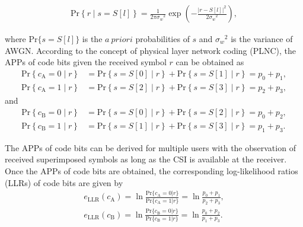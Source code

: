 \begin{align}
 \text{Pr}\left\{r\middle|s = S[l]\right\} = \frac{1}{2\pi{\sigma_w}^{2}}\exp\left(-\frac{\lvert r-S[l]\rvert^{2}}{2{\sigma_w}^{2}}\right) ,
\label{equ:app_2}
\end{align}

where $\text{Pr}\{s = S[l]\}$ is the $a \ priori$ probabilities of $s$ and ${\sigma_w}^2$ is the variance of AWGN. According to the concept of physical layer network coding (PLNC), the APPs of code bits given the received symbol $r$ can be obtained as
\begin{align}
 \text{Pr}\left\{c_\text{A} = 0 \middle| r\right\} &= \text{Pr}\left\{s = S[0]\middle|r\right\} + \text{Pr}\left\{s = S[1]\middle|r\right\} = p_{0} + p_{1}, \nonumber \\
 \text{Pr}\left\{c_\text{A} = 1 \middle| r\right\} &= \text{Pr}\left\{s = S[2]\middle|r\right\} + \text{Pr}\left\{s = S[3]\middle|r\right\} = p_{2} + p_{3},
\end{align}
and
\begin{align}
 \text{Pr}\left\{c_\text{B} = 0 \middle| r\right\} &= \text{Pr}\left\{s = S[0]\middle|r\right\} + \text{Pr}\left\{s = S[2]\middle|r\right\} = p_{0} + p_{2}, \nonumber \\
 \text{Pr}\left\{c_\text{B} = 1 \middle| r\right\} &= \text{Pr}\left\{s = S[1]\middle|r\right\} + \text{Pr}\left\{s = S[3]\middle|r\right\} = p_{1} + p_{3}.
\end{align}

The APPs of code bits can be derived for multiple users with the observation of received superimposed symbols as long as the CSI is available at the receiver. Once the APPs of code bits are obtained, the corresponding log-likelihood ratios (LLRs) of code bits are given by
\begin{align}
 e_{\text{LLR}}(c_\text{A}) = \ln \frac {\text{Pr}\{c_\text{A} = 0|r\}} {\text{Pr}\{c_\text{A} = 1|r\}} = \ln\frac {p_{0}+p_{1}} {p_{2}+p_{3}}, \nonumber \\
 e_{\text{LLR}}(c_\text{B}) = \ln \frac {\text{Pr}\{c_\text{B} = 0|r\}} {\text{Pr}\{c_\text{B} = 1|r\}} = \ln\frac {p_{0}+p_{2}} {p_{1}+p_{3}}.
\label{equ:bit_mapping}
\end{align}


